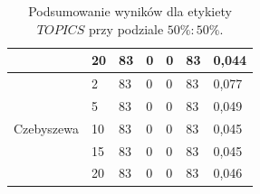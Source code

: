 \documentclass{classrep}
\begin{document}
\begin{table}[!ht]
\begin{tabular}{|l||l|l|l|l|l|l|}
                                      & 20                          & 83            & 0            & 0              & 83             & 0,044                                  \\ \hline
    \multirow{5}{*}{Czebyszewa}       & 2                           & 83            & 0            & 0              & 83             & 0,077                                  \\ \cline{2-7} 
                                      & 5                           & 83            & 0            & 0              & 83             & 0,049                                  \\ \cline{2-7} 
                                      & 10                          & 83            & 0            & 0              & 83             & 0,045                                  \\ \cline{2-7} 
                                      & 15                          & 83            & 0            & 0              & 83             & 0,045                                  \\ \cline{2-7} 
                                      & 20                          & 83            & 0            & 0              & 83             & 0,046                                  \\ \hline
    \end{tabular}
    \caption{Podsumowanie wyników dla etykiety $TOPICS$ przy podziale $50\%:50\%$.}
\end{table}
\end{document}
